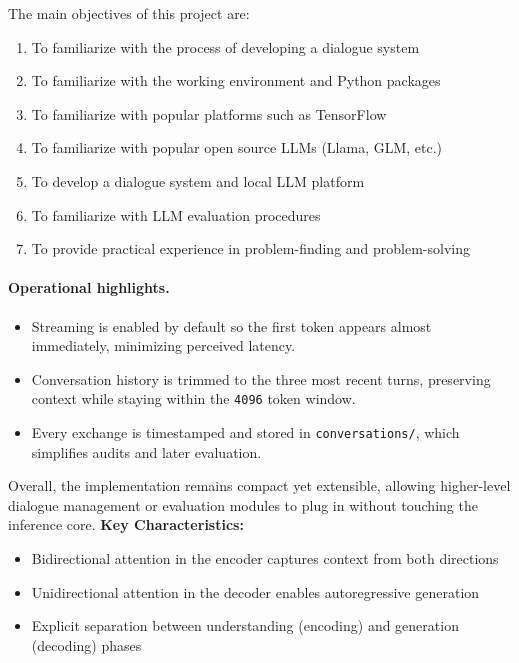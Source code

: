 \documentclass[12pt,a4paper]{article}
\begin{document}
The main objectives of this project are:
\begin{enumerate}
    \item To familiarize with the process of developing a dialogue system
    \item To familiarize with the working environment and Python packages
    \item To familiarize with popular platforms such as TensorFlow
    \item To familiarize with popular open source LLMs (Llama, GLM, etc.)
    \item To develop a dialogue system and local LLM platform
    \item To familiarize with LLM evaluation procedures
    \item To provide practical experience in problem-finding and problem-solving
\end{enumerate}

\paragraph{Operational highlights.}
\begin{itemize}[leftmargin=1.2em]
    \item Streaming is enabled by default so the first token appears almost immediately, minimizing perceived latency.
    \item Conversation history is trimmed to the three most recent turns, preserving context while staying within the \texttt{4096} token window.
    \item Every exchange is timestamped and stored in \texttt{conversations/}, which simplifies audits and later evaluation.
\end{itemize}

Overall, the implementation remains compact yet extensible, allowing higher-level dialogue management or evaluation modules to plug in without touching the inference core.
\textbf{Key Characteristics:}
\begin{itemize}
    \item Bidirectional attention in the encoder captures context from both directions
    \item Unidirectional attention in the decoder enables autoregressive generation
    \item Explicit separation between understanding (encoding) and generation (decoding) phases
\end{itemize}
\end{document}
